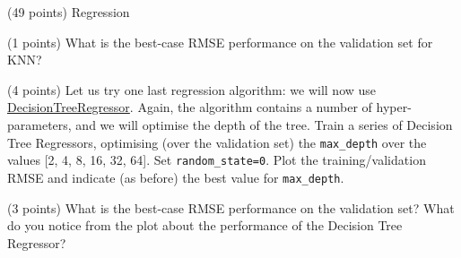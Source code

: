 \documentclass[12pt]{article}
\begin{document}
\begin{question}{\label{Q_LR_BA}(49 points) Regression}
\begin{subquestion}



\end{subquestion}

\begin{subquestion}{(1 points) What is the best-case RMSE performance on the validation set for KNN?}






\end{subquestion}

\begin{subquestion}{(4 points) Let us try one last regression algorithm: we will now use \href{https://scikit-learn.org/stable/modules/generated/sklearn.tree.DecisionTreeRegressor.html}{DecisionTreeRegressor}. Again, the algorithm contains a number of hyper-parameters, and we will optimise the depth of the tree. Train a series of Decision Tree Regressors, optimising (over the validation set) the \texttt{max\_depth} over the values [2, 4, 8, 16, 32, 64]. Set \texttt{random\_state=0}. Plot the training/validation RMSE and indicate (as before) the best value for \texttt{max\_depth}.}






\end{subquestion}

\begin{subquestion}{(3 points) What is the best-case RMSE performance on the validation set? What do you notice from the plot about the performance of the Decision Tree Regressor?}






\end{subquestion}


\end{question}
\end{document}
